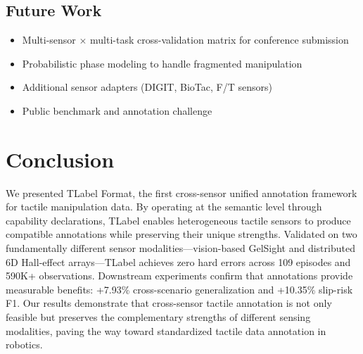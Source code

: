 \documentclass[conference]{IEEEtran}
\begin{document}
\subsection{Future Work}

\begin{itemize}
\item Multi-sensor $\times$ multi-task cross-validation matrix for conference submission
\item Probabilistic phase modeling to handle fragmented manipulation
\item Additional sensor adapters (DIGIT, BioTac, F/T sensors)
\item Public benchmark and annotation challenge
\end{itemize}

\section{Conclusion}

We presented TLabel Format, the first cross-sensor unified annotation framework for tactile manipulation data. By operating at the semantic level through capability declarations, TLabel enables heterogeneous tactile sensors to produce compatible annotations while preserving their unique strengths. Validated on two fundamentally different sensor modalities---vision-based GelSight and distributed 6D Hall-effect arrays---TLabel achieves zero hard errors across 109 episodes and 590K+ observations. Downstream experiments confirm that annotations provide measurable benefits: +7.93\% cross-scenario generalization and +10.35\% slip-risk F1. Our results demonstrate that cross-sensor tactile annotation is not only feasible but preserves the complementary strengths of different sensing modalities, paving the way toward standardized tactile data annotation in robotics.
\end{document}
